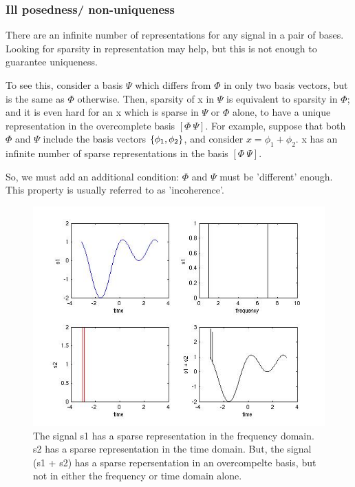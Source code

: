 \documentclass[12pt]{report}
\begin{document}
\subsubsection{Ill posedness/ non-uniqueness}
There are an infinite number of representations for any signal in a pair of bases. Looking for sparsity in representation may help, but this is not enough to guarantee uniqueness.

To see this, consider a basis $\Psi$ which differs from $\Phi$ in only two basis vectors, but is the same as $\Phi$ otherwise. Then, sparsity of x in $\Psi$ is equivalent to sparsity in $\Phi$; and it is even hard for an x which is sparse in $\Psi$ or $\Phi$ alone, to have a unique representation in the overcomplete basis $[\Phi\ \Psi]$. For example, suppose that both $\Phi$ and $\Psi$ include the basis vectors $\left\{ \phi_1, \phi_2 \right\}$, and consider $x = \phi_1 + \phi_2$. x has an infinite number of sparse representations in the basis $[\Phi\ \Psi]$.

So, we must add an additional condition: $\Phi$ and $\Psi$ must be 'different' enough. This property is usually referred to as 'incoherence'.

\begin{figure}
\includegraphics[scale = 0.75]{signalExampleMatlab.jpg}
\caption{The signal s1 has a sparse representation in the frequency domain. s2 has a sparse representation in the time domain. But, the signal (s1 + s2) has a sparse repersentation in an overcompelte basis, but not in either the frequency or time domain alone.}
\label{fig:signalExample}
\end{figure}
\end{document}
